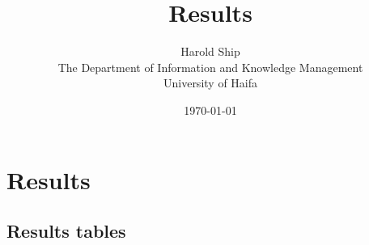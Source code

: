 \documentclass[12pt,a4paper]{book}
\title{Results}
\author{
        Harold Ship \\
                The Department of Information and Knowledge Management \\
        University of Haifa
}
\date{\today}
\begin{document}
\maketitle

\chapter{Results}


\begin{appendices}
\chapter{Results tables}

\end{appendices}



\end{document}
